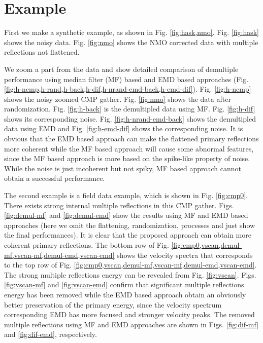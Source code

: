 
\section{Example}
First we make a synthetic example, as shown in Fig. \ref{fig:hask,nmo}. Fig. \ref{fig:hask} shows the noisy data. Fig. \ref{fig:nmo} shows the NMO corrected data with multiple reflections not flattened. 

We zoom a part from the data and show detailed comparison of demultiple performance using median filter (MF) based and EMD based approaches (Fig. \ref{fig:h-ncmp,h-rand,h-back,h-dif,h-nrand-emd-back,h-emd-dif}). Fig. \ref{fig:h-ncmp} shows the noisy zoomed CMP gather. Fig. \ref{fig:nmo} shows the data after randomization.  Fig. \ref{fig:h-back} is the demultipled data using MF. Fig. \ref{fig:h-dif} shows its corresponding noise. Fig. \ref{fig:h-nrand-emd-back} shows the demultipled data using EMD and Fig. \ref{fig:h-emd-dif} shows the corresponding noise. It is obvious that the EMD based approach can make the flattened primary reflections more coherent while the MF based approach will cause some abnormal features, since the MF based approach is more based on the spike-like property of noise. While the noise is just incoherent but not spiky, MF based approach cannot obtain a successful performance. 

The second example is a field data example, which is shown in Fig. \ref{fig:cmp0}.
There exists strong internal multiple reflections in this CMP gather. Figs. \ref{fig:demul-mf} and \ref{fig:demul-emd} show the results using MF and EMD based approaches (here we omit the flattening, randomization, processes and just show the final performances). It is clear that the proposed approach can obtain more coherent primary reflections. The bottom row of Fig. \ref{fig:cmp0,vscan,demul-mf,vscan-mf,demul-emd,vscan-emd} shows the velocity spectra that corresponds to the top row of Fig. \ref{fig:cmp0,vscan,demul-mf,vscan-mf,demul-emd,vscan-emd}. The strong multiple reflections energy can be revealed from Fig. \ref{fig:vscan}. Figs. \ref{fig:vscan-mf} and \ref{fig:vscan-emd} confirm that significant multiple reflections energy has been removed while the EMD based approach obtain an obviously better preservation of the primary energy, since the velocity spectrum corresponding EMD has more focused and stronger velocity peaks. The removed multiple reflections using MF and EMD approaches are shown in Figs. \ref{fig:dif-mf} and \ref{fig:dif-emd}, respectively. 

